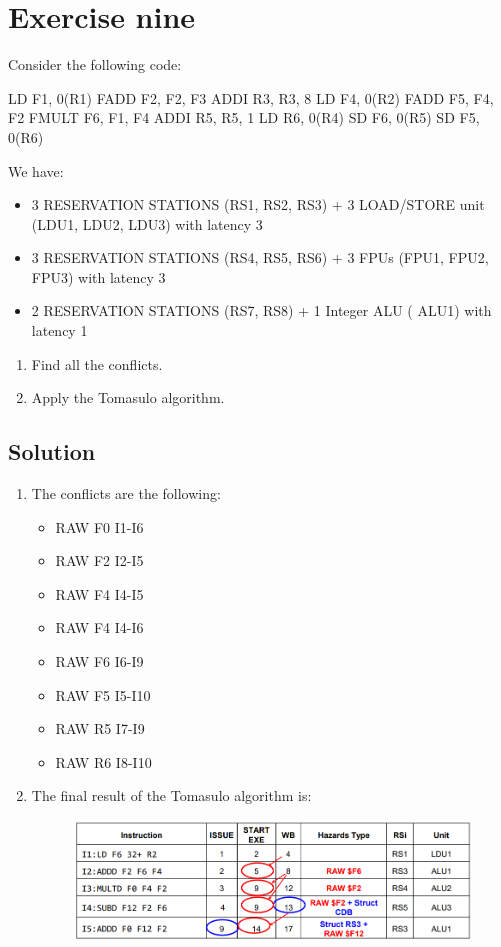 \section{Exercise nine}

Consider the following code: 
\begin{verbnobox}[\verbarg]
LD F1, 0(R1)
FADD F2, F2, F3
ADDI R3, R3, 8
LD F4, 0(R2)
FADD F5, F4, F2
FMULT F6, F1, F4
ADDI R5, R5, 1
LD R6, 0(R4)
SD F6, 0(R5)
SD F5, 0(R6)
\end{verbnobox}
We have: 
\begin{itemize}
    \item 3 RESERVATION STATIONS (RS1, RS2, RS3) + 3 LOAD/STORE unit (LDU1, LDU2, LDU3) with latency 3
    \item 3 RESERVATION STATIONS (RS4, RS5, RS6) + 3 FPUs (FPU1, FPU2, FPU3) with latency 3
    \item 2 RESERVATION STATIONS (RS7, RS8) + 1 Integer ALU ( ALU1) with latency 1
\end{itemize}
\begin{enumerate}
    \item Find all the conflicts. 
    \item Apply the Tomasulo algorithm. 
\end{enumerate}

\subsection*{Solution}
\begin{enumerate}
    \item The conflicts are the following: 
        \begin{itemize}
            \item RAW F0 I1-I6
            \item RAW F2 I2-I5
            \item RAW F4 I4-I5
            \item RAW F4 I4-I6
            \item RAW F6 I6-I9
            \item RAW F5 I5-I10
            \item RAW R5 I7-I9
            \item RAW R6 I8-I10
        \end{itemize}
    \item The final result of the Tomasulo algorithm is: 
        \begin{figure}[H]
            \centering
            \includegraphics[width=1\linewidth]{images/tom.png}
        \end{figure}
\end{enumerate}